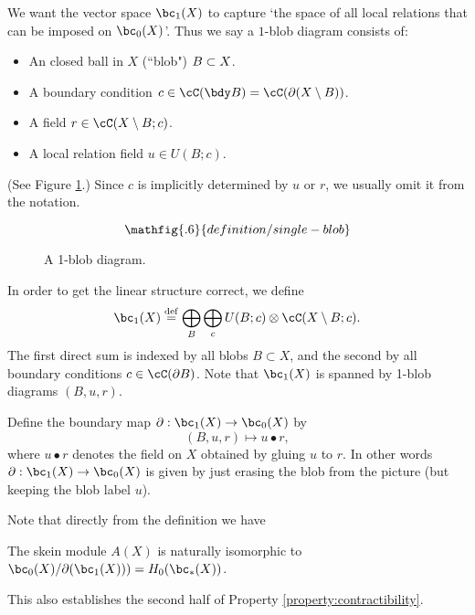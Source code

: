 We want the vector space $\bc_1(X)$ to capture `the space of all local relations that can be imposed on $\bc_0(X)$'.
Thus we say  a $1$-blob diagram consists of:
\begin{itemize}
\item An closed ball in $X$ (``blob") $B \subset X$.
\item A boundary condition $c \in \cC(\bdy B) = \cC(\bd(X \setmin B))$.
\item A field $r \in \cC(X \setmin B; c)$.
\item A local relation field $u \in U(B; c)$.
\end{itemize}
(See Figure \ref{blob1diagram}.) Since $c$ is implicitly determined by $u$ or $r$, we usually omit it from the notation.
\begin{figure}[t]\begin{equation*}
\mathfig{.6}{definition/single-blob}
\end{equation*}\caption{A 1-blob diagram.}\label{blob1diagram}\end{figure}
In order to get the linear structure correct, we define
\[
	\bc_1(X) \deq \bigoplus_B \bigoplus_c U(B; c) \otimes \lf(X \setmin B; c) .
\]
The first direct sum is indexed by all blobs $B\subset X$, and the second
by all boundary conditions $c \in \cC(\bd B)$.
Note that $\bc_1(X)$ is spanned by 1-blob diagrams $(B, u, r)$.

Define the boundary map $\bd : \bc_1(X) \to \bc_0(X)$ by 
\[ 
	(B, u, r) \mapsto u\bullet r, 
\]
where $u\bullet r$ denotes the field on $X$ obtained by gluing $u$ to $r$.
In other words $\bd : \bc_1(X) \to \bc_0(X)$ is given by
just erasing the blob from the picture
(but keeping the blob label $u$).

Note that directly from the definition we have
\begin{thm}
\label{thm:skein-modules}
The skein module $A(X)$ is naturally isomorphic to $\bc_0(X)/\bd(\bc_1(X))) = H_0(\bc_*(X))$.
\end{thm}
This also establishes the second 
half of Property \ref{property:contractibility}.

